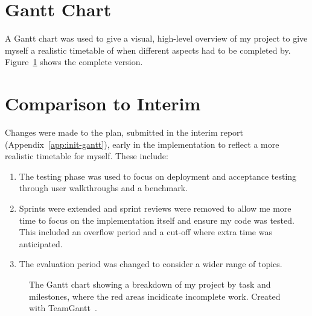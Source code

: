 
\section{Gantt Chart}

A Gantt chart was used to give a visual, high-level overview of my project to give myself a realistic timetable of when different aspects had to be completed by. 
\x
Figure~\ref{fig:gantt-chart} shows the complete version.

\section{Comparison to Interim}

Changes were made to the plan, submitted in the interim report (Appendix~\ref{app:init-gantt}), early in the implementation to reflect a more realistic timetable for myself. These include:

\begin{enumerate}
  \item The testing phase was used to focus on deployment and acceptance testing through user walkthroughs and a benchmark.
  \item Sprints were extended and sprint reviews were removed to allow me more time to focus on the implementation itself and ensure my code was tested. This included an overflow period and a cut-off where extra time was anticipated.
  \item The evaluation period was changed to consider a wider range of topics.
\end{enumerate}

\begin{landscape}
  \begin{figure}
    
    \vspace{150mm}
    \caption{The Gantt chart showing a breakdown of my project by task and milestones, where the red areas incidicate incomplete work. Created with TeamGantt~\cite{noauthor_free_nodate}.}
    \label{fig:gantt-chart}
  \end{figure}
\end{landscape}
